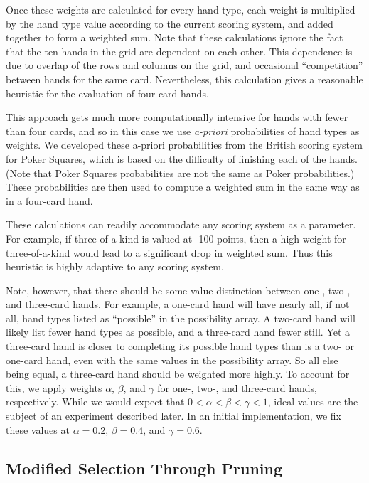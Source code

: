 \documentclass[letterpaper]{article}
\begin{document}
Once these weights are calculated for every hand type, each weight is multiplied by the hand type value according to the current scoring system, and added together to form a weighted sum. Note that these calculations ignore the fact that the ten hands in the grid are dependent on each other. This dependence is due to overlap of the rows and columns on the grid, and occasional ``competition'' between hands for the same card. Nevertheless, this calculation gives a reasonable heuristic for the evaluation of four-card hands.

This approach gets much more computationally intensive for hands with fewer than four cards, and so in this case we use {\it a-priori} probabilities of hand types as weights. We developed these a-priori probabilities from the British scoring system for Poker Squares, which is based on the difficulty of finishing each of the hands. (Note that Poker Squares probabilities are not the same as Poker probabilities.) These probabilities are then used to compute a weighted sum in the same way as in a four-card hand.

These calculations can readily accommodate any scoring system as a parameter. For example, if three-of-a-kind is valued at -100 points, then a high weight for three-of-a-kind would lead to a significant drop in weighted sum. Thus this heuristic is highly adaptive to any scoring system.

Note, however, that there should be some value distinction between one-, two-, and three-card hands. For example, a one-card hand will have nearly all, if not all, hand types listed as ``possible'' in the possibility array. A two-card hand will likely list fewer hand types as possible, and a three-card hand fewer still. Yet a three-card hand is closer to completing its possible hand types than is a two- or one-card hand, even with the same values in the possibility array. So all else being equal, a three-card hand should be weighted more highly. To account for this, we apply weights $\alpha$, $\beta$, and $\gamma$ for one-, two-, and three-card hands, respectively. While we would expect that $0 < \alpha < \beta < \gamma < 1$, ideal values are the subject of an experiment described later. In an initial implementation, we fix these values at $\alpha = 0.2$, $\beta = 0.4$, and $\gamma = 0.6$.

\subsection{Modified Selection Through Pruning}
\end{document}
